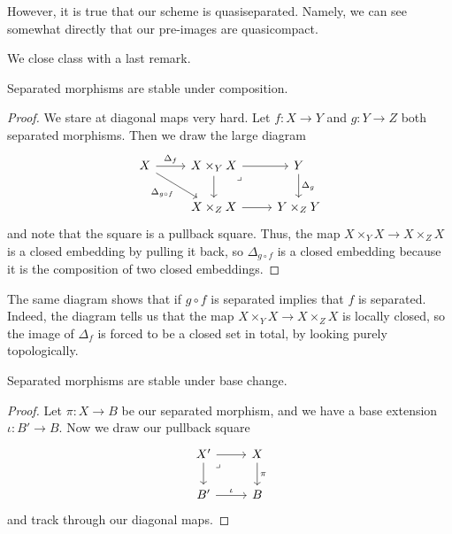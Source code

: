 \documentclass[../notes.tex]{subfiles}
\begin{document}
\begin{remark}
	However, it is true that our scheme is quasiseparated. Namely, we can see somewhat directly that our pre-images are quasicompact.
\end{remark}
We close class with a last remark.
\begin{lemma}
	Separated morphisms are stable under composition.
\end{lemma}
\begin{proof}
	We stare at diagonal maps very hard. Let $f\colon X\to Y$ and $g\colon Y\to Z$ both separated morphisms. Then we draw the large diagram
	\[\begin{tikzcd}
		X & {X\times_YX} & Y \\
		& {X\times_ZX} & {Y\times_ZY}
		\arrow["{\Delta _g}", from=1-3, to=2-3]
		\arrow["{\Delta_f}", from=1-1, to=1-2]
		\arrow["{\Delta_{g\circ f}}"', from=1-1, to=2-2]
		\arrow[from=1-2, to=1-3]
		\arrow[from=2-2, to=2-3]
		\arrow[from=1-2, to=2-2]
		\arrow["\lrcorner"{anchor=center, pos=0.125}, draw=none, from=1-2, to=2-3]
	\end{tikzcd}\]
	and note that the square is a pullback square. Thus, the map $X\times_YX\to X\times_ZX$ is a closed embedding by pulling it back, so $\Delta_{g\circ f}$ is a closed embedding because it is the composition of two closed embeddings.
\end{proof}
\begin{remark}
	The same diagram shows that if $g\circ f$ is separated implies that $f$ is separated. Indeed, the diagram tells us that the map $X\times_YX\to X\times_ZX$ is locally closed, so the image of $\Delta_f$ is forced to be a closed set in total, by looking purely topologically.
\end{remark}
\begin{lemma}
	Separated morphisms are stable under base change.
\end{lemma}
\begin{proof}
	Let $\pi\colon X\to B$ be our separated morphism, and we have a base extension $\iota\colon B'\to B$. Now we draw our pullback square
	\[\begin{tikzcd}
		{X'} & X \\
		{B'} & B
		\arrow["\iota", from=2-1, to=2-2]
		\arrow["\pi", from=1-2, to=2-2]
		\arrow[from=1-1, to=2-1]
		\arrow[from=1-1, to=1-2]
		\arrow["\lrcorner"{anchor=center, pos=0.125}, draw=none, from=1-1, to=2-2]
	\end{tikzcd}\]
	and track through our diagonal maps.
\end{proof}
\end{document}
